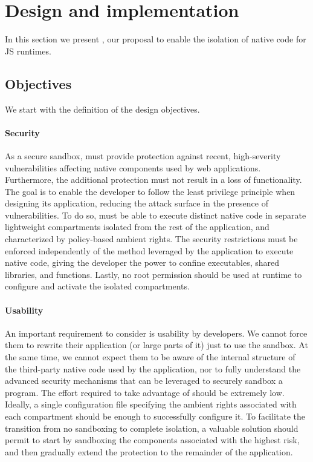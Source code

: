 \section{Design and implementation}
\label{sect:design-and-implementation}

In this section we present \pap, our proposal to enable the isolation
of native code for JS runtimes.

\subsection{Objectives}
\label{subsect:objectives}

We start with the definition of the design objectives.

\paragraph{Security}
As a secure sandbox, \pap must provide protection against recent,
high-severity vulnerabilities affecting native components used by web
applications. Furthermore, the additional protection must not result
in a loss of functionality. The goal is to enable the developer to
follow the least privilege principle when designing its application,
reducing the attack surface in the presence of vulnerabilities.  To do
so, \pap must be able to execute distinct native code in separate lightweight
compartments isolated from the rest of the application, and
characterized by policy-based ambient rights. The security
restrictions must be enforced independently of the method leveraged by
the application to execute native code, giving the developer the power
to confine executables, shared libraries, and functions. Lastly, no
root permission should be used at runtime to configure and activate
the isolated compartments.

\paragraph{Usability}
An important requirement to consider is usability by developers.  We
cannot force them to rewrite their application (or large parts of it)
just to use the sandbox. At the same time, we cannot expect them to be
aware of the internal structure of the third-party native code used by
the application, nor to fully understand the advanced security
mechanisms that can be leveraged to securely sandbox a program. The
effort required to take advantage of \pap should be extremely
low. Ideally, a single configuration file specifying the ambient
rights associated with each compartment should be enough to
successfully configure it. To facilitate the transition from no
sandboxing to complete isolation, a valuable solution should permit to
start by sandboxing the components associated with the highest risk,
and then gradually extend the protection to the remainder of the
application.

